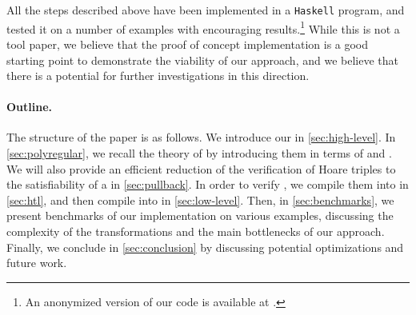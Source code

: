 All the steps described above have been implemented in a \texttt{Haskell}
program, and tested it on a number of examples with encouraging
results.\footnote{An anonymized version of our code is available at
\repositoryUrl.} While this is not a tool paper, we believe that the proof of
concept implementation is a good starting point to demonstrate the viability of
our approach, and we believe that there is a potential for further
investigations in this direction.


\paragraph{Outline.} The structure of the paper is as follows. We introduce our
 in \cref{sec:high-level}. In \cref{sec:polyregular},
we recall the theory of  by introducing them in terms
of  and . We will also
provide an efficient reduction of the verification of Hoare triples to the
satisfiability of a  in \cref{sec:pullback}.
In order to verify , we compile them into  in \cref{sec:htl}, and then compile  into
 in \cref{sec:low-level}. 
%
Then, in \cref{sec:benchmarks}, we present
benchmarks of our implementation on various examples, discussing
the complexity of the transformations and the main bottlenecks of our approach.
Finally, we conclude in \cref{sec:conclusion} by discussing potential
optimizations and future work.


